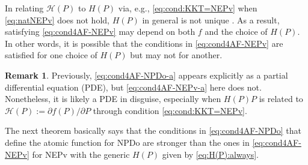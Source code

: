 \documentclass[11pt]{article}
\def\bbP{\mathbb{P}}
\def\scrH{\mathscr{H}}
\def\wtd{\widetilde}
\def\what{\widehat}
\newcommand\STM[2]{{\rm St}(#1,#2)}
\DeclareMathOperator{\tr}{tr}
\DeclareMathOperator{\T}{T}
\theoremstyle{definition}
\newtheorem{remark}{Remark}[section]
\numberwithin{equation}{section}
\begin{document}


In relating $\scrH(P)$ to $H(P)$ via, e.g., \eqref{eq:cond:KKT=NEPv} when \eqref{eq:natNEPv} does not hold,
$H(P)$ in general is not unique  \cite{luli:2024}. As a result,
satisfying \eqref{eq:cond4AF-NEPv} may depend on both $f$ and
the choice of $H(P)$. In other words, it is possible that the conditions in \eqref{eq:cond4AF-NEPv} are satisfied
for one choice of $H(P)$ but may not for another.

\begin{remark}\label{rk:tr-diff-eq:H(P)}
Previously, \eqref{eq:cond4AF-NPDo-a} appears explicitly as a partial differential equation (PDE), but \eqref{eq:cond4AF-NEPv-a} here
does not.
Nonetheless, it is likely a PDE in disguise, especially when $H(P)P$ is related to
$\scrH(P):={\partial f(P)}/{\partial P}$
through condition \eqref{eq:cond:KKT=NEPv}.
\end{remark}

The next theorem basically says that the conditions in \eqref{eq:cond4AF-NPDo} that define the atomic function for  NPDo  are stronger
than the ones in \eqref{eq:cond4AF-NEPv} for  NEPv  with the generic $H(P)$ given by \eqref{eq:H(P):always}.
\end{document}
